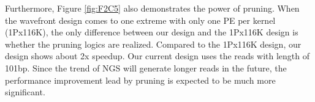 Furthermore, Figure \ref{fig:F2C5} also demonstrates the power of pruning. 
When the wavefront design comes to one extreme with only one PE per kernel (1Px116K), 
the only difference between our design and the 1Px116K design is whether the pruning logics are realized. 
Compared to the 1Px116K design, our design shows about 2x speedup.
Our current design uses the reads with length of 101bp.
Since the trend of NGS will generate longer reads in the future, the performance improvement lead by pruning is expected to be much more significant.
